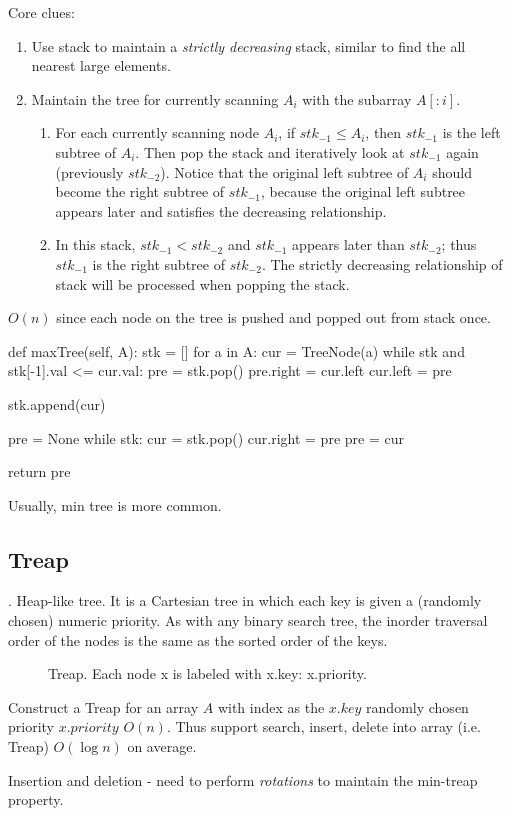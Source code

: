 Core clues:
\begin{enumerate}
\item Use stack to maintain a \textit{strictly decreasing} stack, similar to find the all nearest large elements.
\item Maintain the tree for currently scanning $A_i$ with the subarray $A[:i]$.
\begin{enumerate}
\item {} For each currently scanning node $A_i$, if ${stk}_{-1} \leq A_i$, then ${stk}_{-1}$ is the left subtree of $A_i$. Then pop the stack and iteratively look at ${stk}_{-1}$ again (previously ${stk}_{-2}$). Notice that the original left subtree of $A_i$ should become the right subtree of ${stk}_{-1} $, because the original left subtree appears later and satisfies the decreasing relationship.
\item {} In this stack, ${stk}_{-1} < {stk}_{-2}$ and ${stk}_{-1}$ appears later than ${stk}_{-2}$; thus ${stk}_{-1}$ is the right subtree of ${stk}_{-2}$. The strictly decreasing relationship of stack will be processed when popping the stack. 
\end{enumerate}
\end{enumerate}

$O(n)$ since each node on the tree is pushed and popped out from stack once.


\begin{python}
def maxTree(self, A):
    stk = []
    for a in A:
        cur = TreeNode(a)
        while stk and stk[-1].val <= cur.val:
            pre = stk.pop()
            pre.right = cur.left
            cur.left = pre

        stk.append(cur)

    pre = None
    while stk:
        cur = stk.pop()
        cur.right = pre
        pre = cur

    return pre
\end{python}

Usually, min tree is more common. 
\subsection{Treap}
. Heap-like tree. It is a Cartesian tree in which each key is given a (randomly chosen) numeric priority. As with any binary search tree, the inorder traversal order of the nodes is the same as the sorted order of the keys.

\begin{figure}[hbtp]
\centering
{}
\caption{Treap. Each node x is labeled with x.key: x.priority.}
\label{fig:treap}
\end{figure}

Construct a Treap for an array $A$ with index as the $x.key$ randomly chosen priority $x.priority$ $O(n)$. Thus support search, insert, delete into array (i.e. Treap) $O(\log n)$ on average. 

Insertion and deletion - need to perform \textit{rotations} to maintain the min-treap property. 
